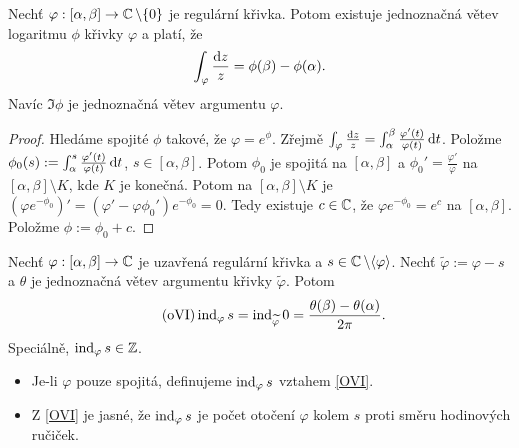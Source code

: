 \begin{theorem}
Nechť $\varphi: [\alpha, \beta] \rightarrow \operatorname{\mathbb{C}}  \setminus \{0\}$ je regulární křivka. Potom existuje jednoznačná větev logaritmu $\phi$ křivky $\varphi$ a platí, že
$$
\int_\varphi \frac{\mathop{}\!\mathrm{d} z}{z}=\phi(\beta) - \phi(\alpha) \text{.}
$$
Navíc $\Im \phi$ je jednoznačná větev argumentu $\varphi$.
\end{theorem}
\begin{proof}
Hledáme spojité $\phi$ takové, že $\varphi=e^\phi$. Zřejmě $\int_\varphi \frac{\mathop{}\!\mathrm{d} z}{z}=\int_\alpha^\beta \frac{\varphi'(t)}{\varphi(t)} \mathop{}\!\mathrm{d} t$. Položme $\phi_0(s):=\int_\alpha^s \frac{\varphi'(t)}{\varphi(t)} \mathop{}\!\mathrm{d} t$, $s \in [\alpha, \beta]$. Potom $\phi_0$ je spojitá na $[\alpha, \beta]$ a $\phi_0'=\frac{\varphi'}{\varphi}$ na $[\alpha, \beta] \setminus K$, kde $K$ je konečná. Potom na $[\alpha, \beta] \setminus K$ je $(\varphi e^{-\phi_0})'=(\varphi' - \varphi \phi_0') e^{-\phi_0}=0$. Tedy existuje $c \in \operatorname{\mathbb{C}} $, že $\varphi e^{-\phi_0}=e^c$ na $[\alpha, \beta]$. Položme $\phi:=\phi_0+c$.
\end{proof}

\begin{theorem}
Nechť $\varphi: [\alpha, \beta] \rightarrow \operatorname{\mathbb{C}} $ je uzavřená regulární křivka a $s \in \operatorname{\mathbb{C}} \setminus \langle \varphi \rangle$. Nechť $\widetilde{\varphi}:=\varphi-s$ a $\theta$ je jednoznačná větev argumentu křivky $\widetilde{\varphi}$. Potom
\begin{equation}\tag{oVI}\label{OVI}
    \operatorname{ind}_\varphi s= \operatorname{ind}_{\widetilde{\varphi}}0=\frac{\theta(\beta)-\theta(\alpha)}{2 \pi}\text{.}
\end{equation}
Speciálně, $\operatorname{ind}_\varphi s \in \operatorname{\mathbb{Z}}$.
\end{theorem}

\begin{note*}
\begin{itemize}
    \item Je-li $\varphi$ pouze spojitá, definujeme $\operatorname{ind}_\varphi s$ vztahem \cref{OVI}.
    \item Z \cref{OVI} je jasné, že $\operatorname{ind}_\varphi s$ je počet otočení $\varphi$ kolem $s$ proti směru hodinových ručiček.
\end{itemize}
\end{note*}


